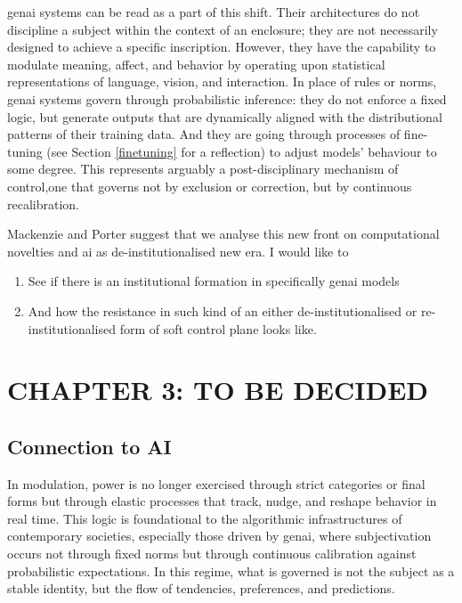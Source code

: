 \Gls{genai} systems can be read as a part of this shift. Their architectures do not discipline a subject within the context of an enclosure; they are not necessarily designed to achieve a specific inscription. However, they have the capability to modulate meaning, affect, and behavior by operating upon statistical representations of language, vision, and interaction. In place of rules or norms, \gls{genai} systems govern through probabilistic inference: they do not enforce a fixed logic, but generate outputs that are dynamically aligned with the distributional patterns of their training data. And they are going through processes of fine-tuning (see Section \ref{finetuning} for a reflection)
to adjust models' behaviour to some degree. This represents arguably a post-disciplinary mechanism of control,one that governs not by exclusion or correction, but by continuous recalibration.

Mackenzie and Porter \parencite*[]{mackenzie2021} suggest that we analyse this
new front on computational novelties and \gls{ai} as  de-institutionalised new
era. I would like to

\begin{enumerate}
	\item See if there is an institutional formation in specifically \gls{genai}
	      models
	\item And how the resistance in such kind of an either de-institutionalised
	      or re-institutionalised form of soft control plane looks like.
\end{enumerate}

%

\noindent\makebox[\linewidth]{\rule{\paperwidth}{0.4pt}}

\section{CHAPTER 3: TO BE DECIDED}
\subsection{Connection to AI}



In modulation, power is no longer exercised through strict categories or final forms but through elastic processes that track, nudge, and reshape behavior in real time. This logic is foundational to the algorithmic infrastructures of contemporary societies, especially those driven by \gls{genai}, where subjectivation occurs not through fixed norms but through continuous calibration against probabilistic expectations. In this regime, what is governed is not the subject as a stable identity, but the flow of tendencies, preferences, and predictions.

